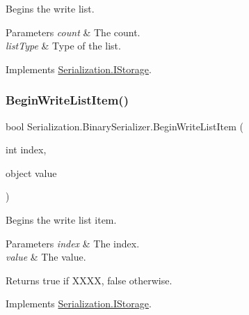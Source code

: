 Begins the write list. 


\begin{DoxyParams}{Parameters}
{\em count} & The count.\\
\hline
{\em list\+Type} & Type of the list.\\
\hline
\end{DoxyParams}


Implements \hyperlink{interface_serialization_1_1_i_storage_afaa8cb1cee211688a43655b1f503ca12}{Serialization.\+I\+Storage}.

\mbox{\label{class_serialization_1_1_binary_serializer_abc94830de965bf945253bc73cc3b7b5c}} 
\subsubsection{\texorpdfstring{Begin\+Write\+List\+Item()}{BeginWriteListItem()}}
{\footnotesize\ttfamily bool Serialization.\+Binary\+Serializer.\+Begin\+Write\+List\+Item (\begin{DoxyParamCaption}\item[{int}]{index,  }\item[{object}]{value }\end{DoxyParamCaption})\hspace{0.3cm}{\ttfamily [inline]}}



Begins the write list item. 


\begin{DoxyParams}{Parameters}
{\em index} & The index.\\
\hline
{\em value} & The value.\\
\hline
\end{DoxyParams}
\begin{DoxyReturn}{Returns}
{\ttfamily true} if X\+X\+XX, {\ttfamily false} otherwise.
\end{DoxyReturn}


Implements \hyperlink{interface_serialization_1_1_i_storage_a1f2891613afdde349dd1bede1187af08}{Serialization.\+I\+Storage}.

\mbox{\label{class_serialization_1_1_binary_serializer_ad2a4bb14be8f85f4de4539f8aaddac49}} 
